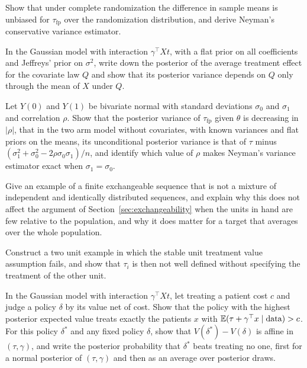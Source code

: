 \begin{exercises}
\item\label{ex:ch01:1} Show that under complete randomization the difference in sample means is unbiased for $\tau_{\mathrm{fp}}$ over the randomization distribution, and derive Neyman's conservative variance estimator.
\item\label{ex:ch01:2} In the Gaussian model with interaction $\gamma^\top X t$, with a flat prior on all coefficients and Jeffreys' prior on $\sigma^2$, write down the posterior of the average treatment effect for the covariate law $Q$ and show that its posterior variance depends on $Q$ only through the mean of $X$ under $Q$.
\item\label{ex:ch01:3} Let $Y(0)$ and $Y(1)$ be bivariate normal with standard deviations $\sigma_0$ and $\sigma_1$ and correlation $\rho$. Show that the posterior variance of $\tau_{\mathrm{fp}}$ given $\theta$ is decreasing in $|\rho|$, that in the two arm model without covariates, with known variances and flat priors on the means, its unconditional posterior variance is that of $\tau$ minus $(\sigma_1^2+\sigma_0^2-2\rho\sigma_0\sigma_1)/n$, and identify which value of $\rho$ makes Neyman's variance estimator exact when $\sigma_1 = \sigma_0$.
\item\label{ex:ch01:4} Give an example of a finite exchangeable sequence that is not a mixture of independent and identically distributed sequences, and explain why this does not affect the argument of Section~\ref{sec:exchangeability} when the units in hand are few relative to the population, and why it does matter for a target that averages over the whole population.
\item\label{ex:ch01:6} Construct a two unit example in which the stable unit treatment value assumption fails, and show that $\tau_i$ is then not well defined without specifying the treatment of the other unit.
\item\label{ex:ch01:7} In the Gaussian model with interaction $\gamma^\top X t$, let treating a patient cost $c$ and judge a policy $\delta$ by its value net of cost. Show that the policy with the highest posterior expected value treats exactly the patients $x$ with $\mathbb{E}(\tau + \gamma^\top x \mid \text{data}) > c$. For this policy $\delta^\ast$ and any fixed policy $\delta$, show that $V(\delta^\ast) - V(\delta)$ is affine in $(\tau, \gamma)$, and write the posterior probability that $\delta^\ast$ beats treating no one, first for a normal posterior of $(\tau, \gamma)$ and then as an average over posterior draws.

\end{exercises}
